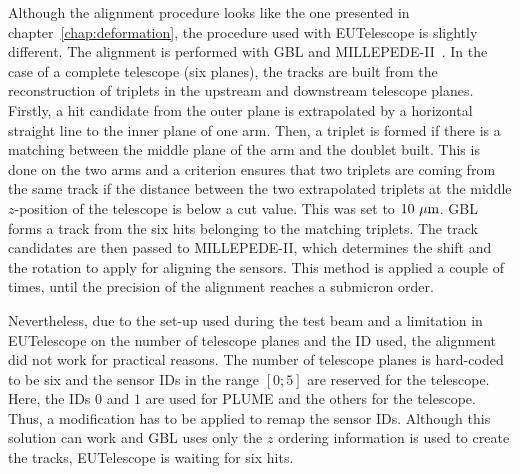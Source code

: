     Although the alignment procedure looks like the one presented in chapter~\ref{chap:deformation}, the procedure used with EUTelescope is slightly different.
    The alignment is performed with \gls{GBL} and MILLEPEDE-II~\cite{MPII}.
    In the case of a complete telescope (six planes), the tracks are built from the reconstruction of triplets in the upstream and downstream telescope planes.
    Firstly, a hit candidate from the outer plane is extrapolated by a horizontal straight line to the inner plane of one arm.
    Then, a triplet is formed if there is a matching between the middle plane of the arm and the doublet built.
    This is done on the two arms and a criterion ensures that two triplets are coming from the same track if the distance between the two extrapolated triplets at the middle $z$-position of the telescope is below a cut value.
    This was set to $10~\rm{\mu m}$.
    \gls{GBL} forms a track from the six hits belonging to the matching triplets.
    The track candidates are then passed to MILLEPEDE-II, which determines the shift and the rotation to apply for aligning the sensors.
    This method is applied a couple of times, until the precision of the alignment reaches a submicron order.

    Nevertheless, due to the set-up used during the test beam and a limitation in EUTelescope on the number of telescope planes and the ID used, the alignment did not work for practical reasons.
    The number of telescope planes is hard-coded to be six and the sensor IDs in the range $[0; 5]$ are reserved for the telescope. 
    Here, the IDs $0$ and $1$ are used for \gls{PLUME} and the others for the telescope.
    Thus, a modification has to be applied to remap the sensor IDs. 
    Although this solution can work and \gls{GBL} uses only the $z$ ordering information is used to create the tracks, EUTelescope is waiting for six hits.
      

